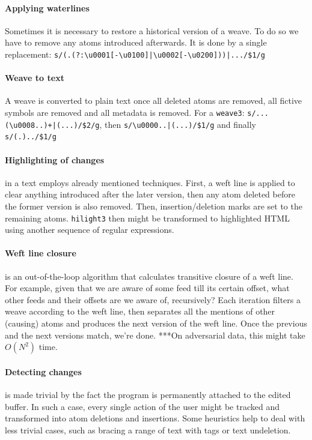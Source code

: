 \documentclass[twocolumn]{article}
\begin{document}
\paragraph{Applying waterlines}
Sometimes it is necessary to restore a historical version of a weave. To do so we have to remove any atoms introduced afterwards. It is done by a single replacement:
\verb+s/(.(?:\u0001[-\u0100]|\u0002[-\u0200]))|.../$1/g+

\paragraph{Weave to text}

A weave is converted to plain text once all deleted atoms are removed, all fictive symbols are removed and all metadata is removed. For a {\tt weave3}: \verb!s/...(\u0008..)+|(...)/$2/g!, then \verb+s/\u0000..|(...)/$1/g+ and finally \verb+s/(.)../$1/g+

\paragraph{Highlighting of changes} in a text employs already mentioned techniques. First, a weft line is applied to clear anything introduced after the later version, then any atom deleted before the former version is also removed. Then, insertion/deletion marks are set to the remaining atoms. {\tt hilight3} then might be transformed to highlighted HTML using another sequence of regular expressions.

\paragraph{Weft line closure} is an out-of-the-loop algorithm that calculates transitive closure of a weft line. For example, given that we are aware of some feed till its certain offset, what other feeds and their offsets are we aware of, recursively? Each iteration filters a weave according to the weft line, then separates all the mentions of other (causing) atoms and produces the next version of the weft line. Once the previous and the next versions match, we're done. ***On adversarial data, this might take $O(N^{2})$ time.

\paragraph{Detecting changes} is made trivial by the fact the program is permanently attached to the edited buffer. In such a case, every single action of the user might be tracked and transformed into atom deletions and insertions. Some heuristics help to deal with less trivial cases, such as bracing a range of text with tags or text undeletion.
\end{document}
